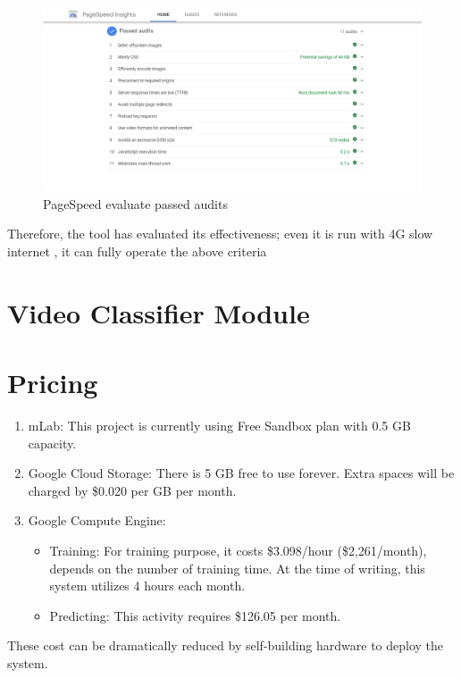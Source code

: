 \begin{center}
	\begin{figure}[H]
		\centering
		\includegraphics[width=1\columnwidth]{images/chap5/pagespeed3.PNG}
		\caption{PageSpeed evaluate passed audits}
	\end{figure}
\end{center}
 Therefore, the tool has evaluated its effectiveness; even it is run with 4G slow internet , it can fully operate the above criteria
\section{Video Classifier Module}
\section{Pricing}
\begin{enumerate}
	\item mLab: This project is currently using Free Sandbox plan with 0.5 GB capacity.
	\item Google Cloud Storage: There is 5 GB free to use forever. Extra spaces will be charged by \$0.020 per GB per month.
	\item Google Compute Engine:
		\begin{itemize}
			\item Training: For training purpose, it costs \$3.098/hour (\$2,261/month), depends on the number of training time. At the time of writing, this system utilizes 4 hours each month.
			\item Predicting: This activity requires \$126.05 per month.
		\end{itemize}
\end{enumerate}
These cost can be dramatically reduced by self-building hardware to deploy the system.